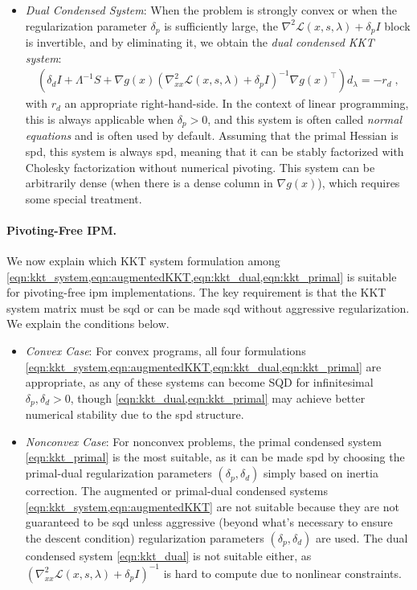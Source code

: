 \documentclass{article}
\begin{document}
\begin{itemize}[leftmargin=*,itemsep=0pt,parsep=0pt,partopsep=0pt]
\item \textit{Dual Condensed System}:
When the problem is strongly convex or when the regularization parameter $\delta_p$ is sufficiently large, the $\nabla^2 \mathcal{L}(x,s,\lambda) + \delta_p I$ block is invertible, and by eliminating it, we obtain the \emph{dual condensed KKT system}:
\begin{align}\label{eqn:kkt_dual}
  \left(\delta_d I + \Lambda^{-1}S + \nabla g(x)\left(\nabla_{x x}^2 \mathcal{L}(x,s,\lambda) + \delta_p I\right)^{-1} \nabla g(x)^\top\right)
  d_\lambda = - r_d \; ,
\end{align}
with $r_d$ an appropriate right-hand-side.
In the context of linear programming, this is always applicable when $\delta_p>0$, and this system is often called \emph{normal equations} and is often used by default.
Assuming that the primal Hessian is \gls*{spd}, this system is always \gls*{spd}, meaning that it can be stably factorized with Cholesky factorization without numerical pivoting.
This system can be arbitrarily dense (when there is a dense column in $\nabla g(x)$), which requires some special treatment.
\end{itemize}


\paragraph{Pivoting-Free IPM.}
We now explain which KKT system formulation among \cref{eqn:kkt_system,eqn:augmentedKKT,eqn:kkt_dual,eqn:kkt_primal} is suitable for pivoting-free \gls*{ipm} implementations. The key requirement is that the KKT system matrix must be \gls*{sqd} or can be made \gls*{sqd} without aggressive regularization. We explain the conditions below.
\begin{itemize}[leftmargin=*,itemsep=0pt,parsep=0pt,partopsep=0pt]
\item \textit{Convex Case}:
  For convex programs, all four formulations \cref{eqn:kkt_system,eqn:augmentedKKT,eqn:kkt_dual,eqn:kkt_primal} are appropriate, as any of these systems can become SQD for infinitesimal $\delta_p, \delta_d > 0$, though \cref{eqn:kkt_dual,eqn:kkt_primal} may achieve better numerical stability due to the \gls*{spd} structure.
\item \textit{Nonconvex Case}:
  For nonconvex problems, the primal condensed system \cref{eqn:kkt_primal} is the most suitable, as it can be made \gls*{spd} by choosing the primal-dual regularization parameters $(\delta_p, \delta_d)$ simply based on inertia correction.
  The augmented or primal-dual condensed systems \cref{eqn:kkt_system,eqn:augmentedKKT} are not suitable because they are not guaranteed to be \gls*{sqd} unless {aggressive} (beyond what's necessary to ensure the descent condition) regularization parameters $(\delta_p, \delta_d)$ are used.
  The dual condensed system \cref{eqn:kkt_dual} is not suitable either, as $(\nabla^2_{x x} \mathcal{L}(x,s,\lambda) + \delta_p I)^{-1}$ is hard to compute due to nonlinear constraints.
\end{itemize}
\end{document}
